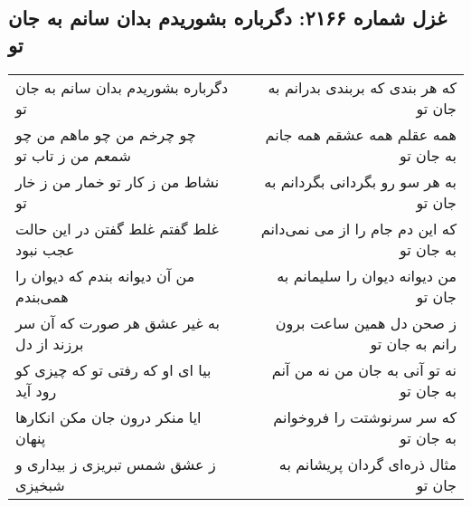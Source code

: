 \begin{center}
\section*{غزل شماره ۲۱۶۶: دگرباره بشوریدم بدان سانم به جان تو}
\label{sec:2166}
\begin{longtable}{l p{0.5cm} r}
دگرباره بشوریدم بدان سانم به جان تو
&&
که هر بندی که بربندی بدرانم به جان تو
\\
چو چرخم من چو ماهم من چو شمعم من ز تاب تو
&&
همه عقلم همه عشقم همه جانم به جان تو
\\
نشاط من ز کار تو خمار من ز خار تو
&&
به هر سو رو بگردانی بگردانم به جان تو
\\
غلط گفتم غلط گفتن در این حالت عجب نبود
&&
که این دم جام را از می نمی‌دانم به جان تو
\\
من آن دیوانه بندم که دیوان را همی‌بندم
&&
من دیوانه دیوان را سلیمانم به جان تو
\\
به غیر عشق هر صورت که آن سر برزند از دل
&&
ز صحن دل همین ساعت برون رانم به جان تو
\\
بیا ای او که رفتی تو که چیزی کو رود آید
&&
نه تو آنی به جان من نه من آنم به جان تو
\\
ایا منکر درون جان مکن انکارها پنهان
&&
که سر سرنوشتت را فروخوانم به جان تو
\\
ز عشق شمس تبریزی ز بیداری و شبخیزی
&&
مثال ذره‌ای گردان پریشانم به جان تو
\\
\end{longtable}
\end{center}
